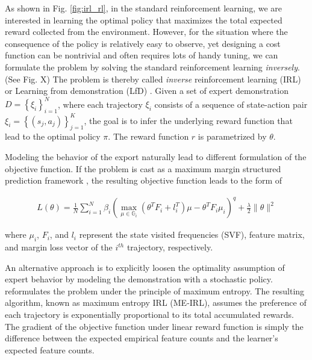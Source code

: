 \documentclass[../thesis.tex]{subfiles}
\begin{document}
As shown in Fig. \ref{fig:irl_rl},
in the standard reinforcement learning, we are interested in learning the optimal policy that maximizes the total expected reward collected from the environment. However, for the situation where the consequence of the policy is relatively easy to observe, yet designing a cost function can be nontrivial and often requires lots of handy tuning, we can formulate the problem by solving the standard reinforcement learning \textit{inversely}. (See Fig. X) The problem is thereby called \textit{inverse} reinforcement learning (IRL) or Learning from demonstration (LfD) . Given a set of expert demonstration $D=\left\{ \xi_i \right\}_{i=1}^{N}$, where each trajectory $\xi_i$ consists of a sequence of state-action pair $\xi_i = \left\{ (s_j, a_j) \right\}_{j=1}^{K}$, the goal is to infer the underlying reward function that lead to the optimal policy $\pi$. The reward function $r$ is parametrized by $\theta$.

Modeling the behavior of the export naturally lead to different formulation of the objective function. If the problem is cast as a maximum margin structured prediction framework \cite{ratliff2006maximum}, the resulting objective function leads to the form of

\begin{align}
L(\theta) = \frac{1}{N} \sum^{N}_{i=1} \beta_i ( \max_{\mu \in \mathbb{G}_i}(\theta^T F_i + l_i^T)\mu - \theta^TF_i\mu_i )^q +  \frac{\lambda}{2} \| \theta \|^2
\end{align}

where $\mu_i$, $F_i$, and $l_i$ represent the state visited frequencies (SVF), feature matrix, and margin loss vector of the $i^{th}$ trajectory, respectively.


An alternative approach is to explicitly loosen the optimality assumption of expert behavior by modeling the demonstration with a stochastic policy. \citet{ziebart2008maximum} reformulates the problem under the principle of maximum entropy. The resulting algorithm, known as maximum entropy IRL (ME-IRL), assumes the preference of each trajectory is exponentially proportional to its total accumulated rewards. The gradient of the objective function under linear reward function is simply the difference between the expected empirical feature counts and the learner's expected feature counts. 
\end{document}
